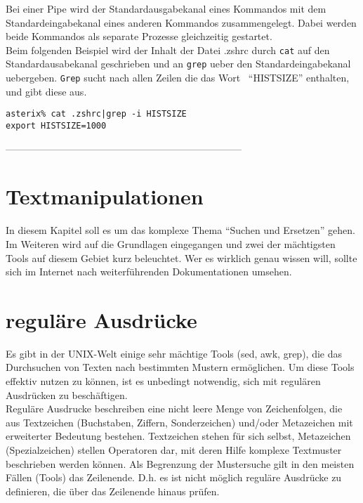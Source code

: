 \documentclass[12pt,]{article}
\begin{document}
Bei einer Pipe wird der Standardausgabekanal eines Kommandos mit dem
Standardeingabekanal eines anderen Kommandos zusammengelegt. Dabei
werden beide Kommandos als separate Prozesse gleichzeitig gestartet.\\
Beim folgenden Beispiel wird der Inhalt der Datei .zshrc durch
\texttt{cat} auf den Standardausabekanal geschrieben und an
\texttt{grep} ueber den Standardeingabekanal uebergeben. \texttt{Grep}
sucht nach allen Zeilen die das Wort~ ``HISTSIZE'' enthalten, und gibt
diese aus.

\begin{verbatim}
asterix% cat .zshrc|grep -i HISTSIZE
export HISTSIZE=1000
\end{verbatim}

------------------------------------------------------------------------

\section{Textmanipulationen}\label{textmanipulationen}

In diesem Kapitel soll es um das komplexe Thema ``Suchen und Ersetzen''
gehen. Im Weiteren wird auf die Grundlagen eingegangen und zwei der
mächtigsten Tools auf diesem Gebiet kurz beleuchtet. Wer es wirklich
genau wissen will, sollte sich im Internet nach weiterführenden
Dokumentationen umsehen.

\section{reguläre Ausdrücke}\label{reguluxe4re-ausdruxfccke}

Es gibt in der UNIX-Welt einige sehr mächtige Tools (sed, awk, grep),
die das Durchsuchen von Texten nach bestimmten Mustern ermöglichen. Um
diese Tools effektiv nutzen zu können, ist es unbedingt notwendig, sich
mit regulären Ausdrücken zu beschäftigen.\\
Reguläre Ausdrucke beschreiben eine nicht leere Menge von Zeichenfolgen,
die aus Textzeichen (Buchstaben, Ziffern, Sonderzeichen) und/oder
Metazeichen mit erweiterter Bedeutung bestehen. Textzeichen stehen für
sich selbst, Metazeichen (Spezialzeichen) stellen Operatoren dar, mit
deren Hilfe komplexe Textmuster beschrieben werden können. Als
Begrenzung der Mustersuche gilt in den meisten Fällen (Tools) das
Zeilenende. D.h. es ist nicht möglich reguläre Ausdrücke zu definieren,
die über das Zeilenende hinaus prüfen.
\end{document}
